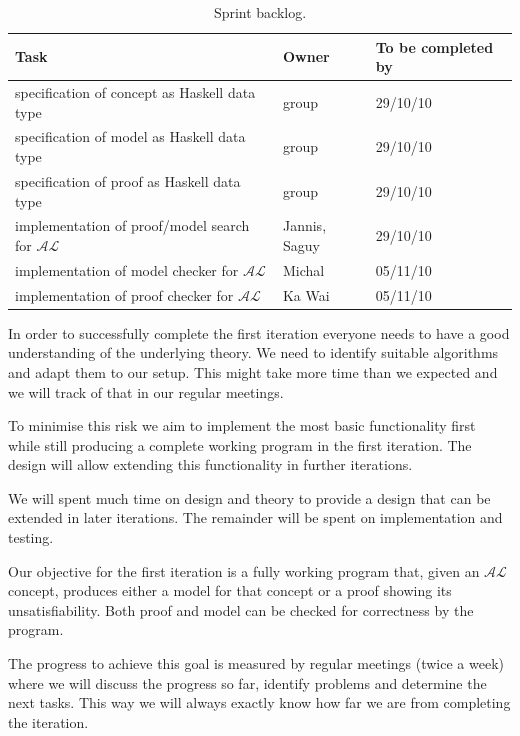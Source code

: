 
\begin{table}
  \caption{Sprint backlog.}
  \begin{tabular}{l|l|l}
    \hline
    \textbf{Task} & \textbf{Owner} & \textbf{To be completed by} \\
    \hline
    specification of concept as Haskell data type & group & 29/10/10 \\
    specification of model as Haskell data type & group & 29/10/10 \\
    specification of proof as Haskell data type & group & 29/10/10 \\
    implementation of proof/model search for $\mathcal{AL}$ & Jannis, Saguy & 29/10/10 \\
    implementation of model checker for $\mathcal{AL}$ & Michal & 05/11/10 \\
    implementation of proof checker for $\mathcal{AL}$ & Ka Wai & 05/11/10
  \end{tabular}
  \label{sprint}
\end{table}


In order to successfully complete the first iteration everyone needs to have a good
understanding of the underlying theory. We need to identify suitable algorithms and
adapt them to our setup. This might take more time than we expected and we will 
track of that in our regular meetings.

To minimise this risk we aim to implement the most basic functionality first while
still producing a complete working program in the first iteration. The design will
allow extending this functionality in further iterations.

We will spent much time on design and theory to provide a design that can be extended
in later iterations. The remainder will be spent on implementation and testing.


Our objective for the first iteration is a fully working program that, given an
$\mathcal{AL}$ concept, produces either a model for that concept or a proof showing its
unsatisfiability. Both proof and model can be checked for correctness by the program.

The progress to achieve this goal is measured by regular meetings (twice a week) where
we will discuss the progress so far, identify problems and determine the next tasks. This
way we will always exactly know how far we are from completing the iteration.

